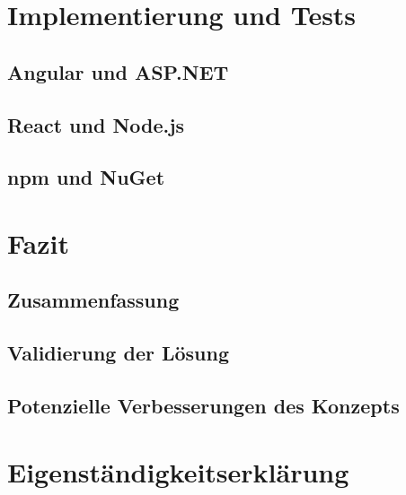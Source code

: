 \documentclass[12pt]{book}          %
\begin{document}
\chapter{Implementierung und Tests}
\label{chap-implementierung-und-tests}

\section{Angular und ASP.NET}
\label{sec-angular-und-aps-net}

\section{React und Node.js}
\label{sec-react-und-node-js}

\section{npm und NuGet}
\label{sec-npm-und-nu-get}

\chapter{Fazit}
\label{chap-fazit}

\section{Zusammenfassung}
\label{sec-zusammenfassung}

\section{Validierung der Lösung}
\label{sec-validierung-der-loesung}

\section{Potenzielle Verbesserungen des Konzepts}
\label{sec-potenzielle-verbesserungen-des-konzepts}

\printbibliography

\appendix

\chapter{Eigenständigkeitserklärung}
\end{document}
